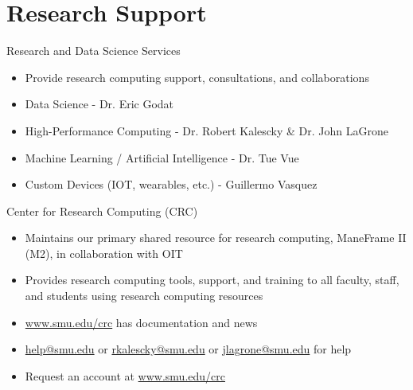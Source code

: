 \section{Research Support}

\begin{frame}{Research and Data Science Services}
\begin{itemize}
  \item Provide research computing support, consultations, and collaborations
  \item Data Science - Dr. Eric Godat
  \item High-Performance Computing - Dr. Robert Kalescky \& Dr. John LaGrone
  \item Machine Learning / Artificial Intelligence - Dr. Tue Vue
  \item Custom Devices (IOT, wearables, etc.) - Guillermo Vasquez
\end{itemize}
\end{frame}

\begin{frame}{Center for Research Computing (CRC)}
\begin{itemize}
  \item Maintains our primary shared resource for research computing, ManeFrame II (M2), in collaboration with OIT
  \item Provides research computing tools, support, and training to all faculty, staff, and students using research computing resources
  \item \url{www.smu.edu/crc} has documentation and news
  \item \href{mailto:help@smu.edu}{help@smu.edu} or \href{mailto:rkalescky@smu.edu}{rkalescky@smu.edu} or \href{mailto:jlagrone@smu.edu}{jlagrone@smu.edu} for help
  \item Request an account at \url{www.smu.edu/crc}
\end{itemize}
\end{frame}

